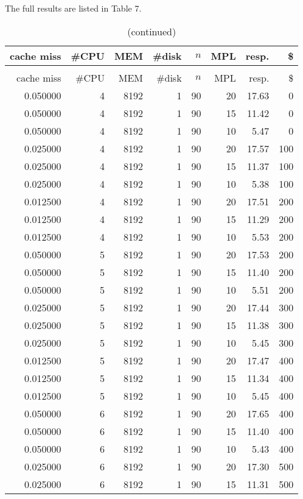 \documentclass[12pt,letterpaper]{article}
\begin{document}
The full results are listed in Table 7.
\begin{center}
\begin{longtable}{r|r|r|r|r|r|r|r}
\caption{Finding the Optimal Investment Combination with Exhaustive Enumeration}\\
cache miss & \#CPU & MEM & \#disk & $n$ & MPL & resp. & \$ \\ \hline \endfirsthead
\caption{(continued)}\\
cache miss & \#CPU & MEM & \#disk & $n$ & MPL & resp. & \$ \\ \hline \endhead
0.050000 & 4 & 8192 & 1 & 90 & 20 & 17.63 & 0 \\
0.050000 & 4 & 8192 & 1 & 90 & 15 & 11.42 & 0 \\
0.050000 & 4 & 8192 & 1 & 90 & 10 & 5.47 & 0 \\
0.025000 & 4 & 8192 & 1 & 90 & 20 & 17.57 & 100 \\
0.025000 & 4 & 8192 & 1 & 90 & 15 & 11.37 & 100 \\
0.025000 & 4 & 8192 & 1 & 90 & 10 & 5.38 & 100 \\
0.012500 & 4 & 8192 & 1 & 90 & 20 & 17.51 & 200 \\
0.012500 & 4 & 8192 & 1 & 90 & 15 & 11.29 & 200 \\
0.012500 & 4 & 8192 & 1 & 90 & 10 & 5.53 & 200 \\
0.050000 & 5 & 8192 & 1 & 90 & 20 & 17.53 & 200 \\
0.050000 & 5 & 8192 & 1 & 90 & 15 & 11.40 & 200 \\
0.050000 & 5 & 8192 & 1 & 90 & 10 & 5.51 & 200 \\
0.025000 & 5 & 8192 & 1 & 90 & 20 & 17.44 & 300 \\
0.025000 & 5 & 8192 & 1 & 90 & 15 & 11.38 & 300 \\
0.025000 & 5 & 8192 & 1 & 90 & 10 & 5.45 & 300 \\
0.012500 & 5 & 8192 & 1 & 90 & 20 & 17.47 & 400 \\
0.012500 & 5 & 8192 & 1 & 90 & 15 & 11.34 & 400 \\
0.012500 & 5 & 8192 & 1 & 90 & 10 & 5.45 & 400 \\
0.050000 & 6 & 8192 & 1 & 90 & 20 & 17.65 & 400 \\
0.050000 & 6 & 8192 & 1 & 90 & 15 & 11.40 & 400 \\
0.050000 & 6 & 8192 & 1 & 90 & 10 & 5.43 & 400 \\
0.025000 & 6 & 8192 & 1 & 90 & 20 & 17.30 & 500 \\
0.025000 & 6 & 8192 & 1 & 90 & 15 & 11.31 & 500 \\

\end{longtable}
\end{center}
\end{document}

